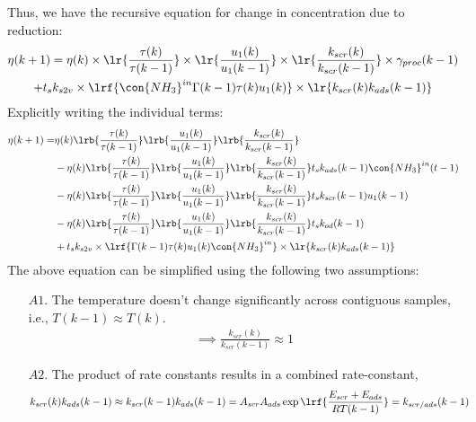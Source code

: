 Thus, we have the recursive equation for change in concentration due to reduction:
\begin{multline}
        \eta(k+1) = \eta(k) \times \lr{\frac{\tau(k)}{\tau(k-1)}}
                                \times \lr{\frac{u_1(k)}{u_1(k-1)}}
                                \times \lr{\frac{k_{scr}(k)}{k_{scr}(k-1)}}
                                \times \gamma_{proc}(k-1)
                                \\
                        + t_s k_{s2v} \times \lrf{\con{NH_3}^{in} \Gamma(k-1) \tau(k) u_1(k)} \times \lr{k_{scr}(k) k_{ads}(k-1)}
\end{multline}
Explicitly writing the individual terms:
\begin{align*}
        \eta(k+1) =& \eta(k) \lrb{\frac{\tau(k)}{\tau(k-1)}}
                                \lrb{\frac{u_1(k)}{u_1(k-1)}}
                                \lrb{\frac{k_{scr}(k)}{k_{scr}(k-1)}} \\
                &-\eta(k) \lrb{\frac{\tau(k)}{\tau(k-1)}}
                                \lrb{\frac{u_1(k)}{u_1(k-1)}}
                                \lrb{\frac{k_{scr}(k)}{k_{scr}(k-1)}}
                t_s k_{ads}(k-1) \con{NH_3}^{in}(t-1)
                \\
                &-\eta(k) \lrb{\frac{\tau(k)}{\tau(k-1)}}
                                \lrb{\frac{u_1(k)}{u_1(k-1)}}
                                \lrb{\frac{k_{scr}(k)}{k_{scr}(k-1)}}
                t_s k_{scr}(k-1) u_1(k-1)
                \\
                &-\eta(k) \lrb{\frac{\tau(k)}{\tau(k-1)}}
                                \lrb{\frac{u_1(k)}{u_1(k-1)}}
                                \lrb{\frac{k_{scr}(k)}{k_{scr}(k-1)}}
                t_s k_{od}(k-1)
                \\
                &+ t_s k_{s2v} \times \lrf{\Gamma(k-1) \tau(k) u_1(k) \con{NH_3}^{in}} \times \lr{k_{scr}(k) k_{ads}(k-1)}
\end{align*}
The above equation can be simplified using the following two assumptions:
\begin{itemize}
        \item[$A1.$] The temperature doesn't change significantly across contiguous samples, i.e., $T(k-1) \approx T(k)$.
        \begin{align}
                \implies \frac{k_{scr}(k)}{k_{scr}(k-1)} \approx 1
        \end{align}
        \item[$A2.$] The product of rate constants results in a combined rate-constant,
        \begin{align}
                k_{scr}(k) k_{ads}(k-1) &\approx k_{scr}(k-1) k_{ads}(k-1)  = A_{scr}A_{ads} \exp\lrf{\frac{E_{scr}+E_{ads}}{R T(k-1)}} = k_{scr/ads}(k-1)
        \end{align}
\end{itemize}
